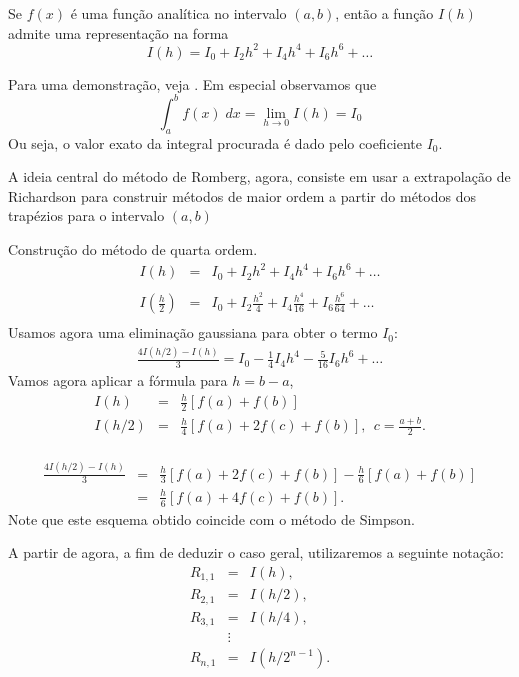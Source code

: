 \begin{teo} Se $f(x)$ é uma função analítica no intervalo $(a,b)$, então a função $I(h)$ admite uma representação na forma
\begin{equation} I(h)=I_0 + I_2 h^2 + I_4{h^4}+ I_6{h^6}+\ldots \end{equation}
\end{teo}
Para uma demonstração, veja \cite{DEMAILLY}. Em especial observamos que
\begin{equation} \int_a^b f(x)\;dx = \lim_{h\to 0}I(h)=I_0 \end{equation}
Ou seja, o valor exato da integral procurada é dado pelo coeficiente $I_0$.

A ideia central do método de Romberg, agora, consiste em usar a extrapolação de Richardson para construir métodos de maior ordem a partir do métodos dos trapézios para o intervalo $(a,b)$
\begin{ex} \label{exemplo_romberg_1}Construção do método de quarta ordem.
\begin{eqnarray}
I(h)&=&I_0 + I_2 h^2 + I_4{h^4}+ I_6{h^6}+\ldots\\~\\
I\left(\frac{h}{2}\right)&=&I_0 + I_2 \frac{h^2}{4} + I_4\frac{h^4}{16}+ I_6\frac{h^6}{64}+\ldots\\
\end{eqnarray}
Usamos agora uma eliminação gaussiana para obter o termo $I_0$:
\begin{eqnarray}
\frac{4I(h/2)-I(h)}{3}=I_0-\frac{1}{4}I_4h^4-\frac{5}{16}I_6h^6+\ldots
\end{eqnarray}
Vamos agora aplicar a fórmula para $h=b-a$,
\begin{eqnarray}
I(h)&=& \frac{h}{2} \left[f(a)+f(b)\right]\\
I(h/2)&=& \frac{h}{4} \left[f(a)+2f\left(c\right)+f(b)\right],~~ c=\frac{a+b}{2}.\\
\end{eqnarray}

\begin{eqnarray}
\frac{4I(h/2)-I(h)}{3}&=&\frac{h}{3}\left[f(a)+2f\left(c\right)+f(b)\right]-\frac{h}{6} \left[f(a)+f(b)\right]\\
&=&\frac{h}{6}\left[f(a)+4f\left(c\right)+f(b)\right].
\end{eqnarray}
Note que este esquema obtido coincide com o método de Simpson.
\end{ex}

A partir de agora, a fim de deduzir o caso geral, utilizaremos a seguinte notação:
\begin{eqnarray}
R_{1,1}&=&I(h),\\
R_{2,1}&=&I(h/2),\\
R_{3,1}&=&I(h/4),\\
&\vdots&\\
R_{n,1}&=&I(h/2^{n-1}).
\end{eqnarray}

